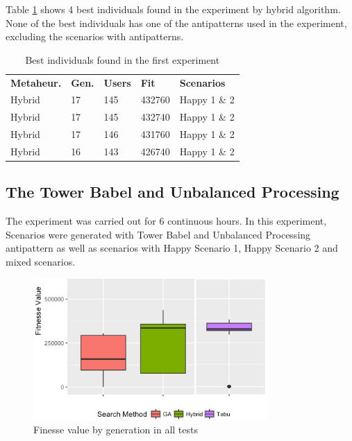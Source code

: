 \documentclass[espaco=umemeio,chapter=TITLE,twoside,openright]{abnt}
\begin{document}
Table \ref{tab:bestindividuals} shows 4 best individuals found in the experiment by hybrid algorithm. None of the best individuals has one of the antipatterns used in the experiment, excluding the scenarios with antipatterns.

\begin{table}[h]
\centering
\caption{Best individuals found in the first experiment}
\label{tab:bestindividuals}
\begin{tabular}{lllll}
\rowcolor[HTML]{C0C0C0}
\textbf{Metaheur.} & \textbf{Gen.} & \textbf{Users} & \textbf{Fit} & \textbf{Scenarios}  \\
Hybrid & 17 & 145 & 432760 & Happy 1 \& 2  \\
Hybrid & 17 & 145 & 432740 & Happy 1 \& 2   \\
Hybrid & 17 & 146 & 431760 & Happy 1 \& 2  \\
Hybrid & 16 & 143 & 426740 & Happy 1 \& 2
\end{tabular}
\end{table}



\subsection{The Tower Babel  and Unbalanced Processing}


The experiment was carried out for 6 continuous hours. In this experiment, Scenarios were generated with Tower Babel and Unbalanced Processing antipattern as well as scenarios with Happy Scenario 1, Happy Scenario 2 and mixed scenarios.

\begin{figure}[h]
\centering
\includegraphics[width=0.8\textwidth]{./images/antipattern2.png}
\caption{Finesse value by generation in all tests}
\label{fig:boxplot2}
\end{figure}
\end{document}
